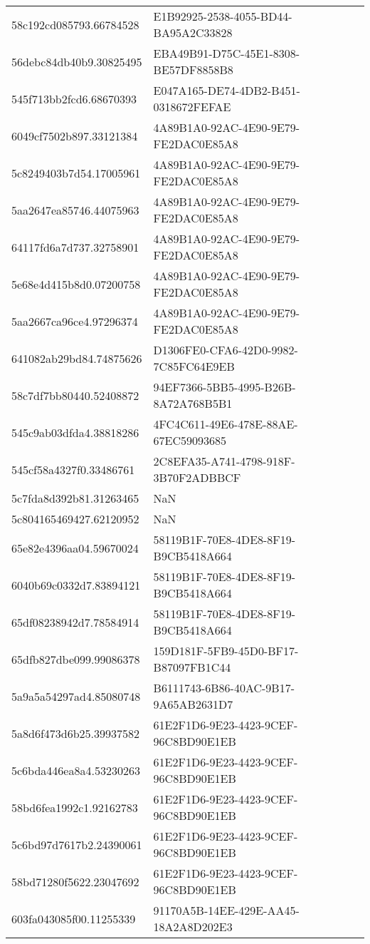 \begin{tabular}{ll}
58c192cd085793.66784528 & E1B92925-2538-4055-BD44-BA95A2C33828 \\
56debc84db40b9.30825495 & EBA49B91-D75C-45E1-8308-BE57DF8858B8 \\
545f713bb2fcd6.68670393 & E047A165-DE74-4DB2-B451-0318672FEFAE \\
6049cf7502b897.33121384 & 4A89B1A0-92AC-4E90-9E79-FE2DAC0E85A8 \\
5c8249403b7d54.17005961 & 4A89B1A0-92AC-4E90-9E79-FE2DAC0E85A8 \\
5aa2647ea85746.44075963 & 4A89B1A0-92AC-4E90-9E79-FE2DAC0E85A8 \\
64117fd6a7d737.32758901 & 4A89B1A0-92AC-4E90-9E79-FE2DAC0E85A8 \\
5e68e4d415b8d0.07200758 & 4A89B1A0-92AC-4E90-9E79-FE2DAC0E85A8 \\
5aa2667ca96ce4.97296374 & 4A89B1A0-92AC-4E90-9E79-FE2DAC0E85A8 \\
641082ab29bd84.74875626 & D1306FE0-CFA6-42D0-9982-7C85FC64E9EB \\
58c7df7bb80440.52408872 & 94EF7366-5BB5-4995-B26B-8A72A768B5B1 \\
545c9ab03dfda4.38818286 & 4FC4C611-49E6-478E-88AE-67EC59093685 \\
545cf58a4327f0.33486761 & 2C8EFA35-A741-4798-918F-3B70F2ADBBCF \\
5c7fda8d392b81.31263465 & NaN \\
5c804165469427.62120952 & NaN \\
65e82e4396aa04.59670024 & 58119B1F-70E8-4DE8-8F19-B9CB5418A664 \\
6040b69c0332d7.83894121 & 58119B1F-70E8-4DE8-8F19-B9CB5418A664 \\
65df08238942d7.78584914 & 58119B1F-70E8-4DE8-8F19-B9CB5418A664 \\
65dfb827dbe099.99086378 & 159D181F-5FB9-45D0-BF17-B87097FB1C44 \\
5a9a5a54297ad4.85080748 & B6111743-6B86-40AC-9B17-9A65AB2631D7 \\
5a8d6f473d6b25.39937582 & 61E2F1D6-9E23-4423-9CEF-96C8BD90E1EB \\
5c6bda446ea8a4.53230263 & 61E2F1D6-9E23-4423-9CEF-96C8BD90E1EB \\
58bd6fea1992c1.92162783 & 61E2F1D6-9E23-4423-9CEF-96C8BD90E1EB \\
5c6bd97d7617b2.24390061 & 61E2F1D6-9E23-4423-9CEF-96C8BD90E1EB \\
58bd71280f5622.23047692 & 61E2F1D6-9E23-4423-9CEF-96C8BD90E1EB \\
603fa043085f00.11255339 & 91170A5B-14EE-429E-AA45-18A2A8D202E3 \\

\end{tabular}
